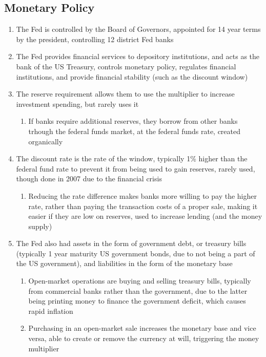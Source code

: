 \documentclass[11 pt, twoside]{article}
\begin{document}
\subsection{Monetary Policy}
\begin{enumerate}
\item The Fed is controlled by the Board of Governors, appointed for 14 year terms by the president, controlling 12 district Fed banks
\item The Fed provides financial services to depository institutions, and acts as the bank of the US Treasury, controls monetary policy, regulates financial institutions, and provide financial stability (such as the discount window)
\item The reserve requirement allows them to use the multiplier to increase investment spending, but rarely uses it
\begin{enumerate}
\item If banks require additional reserves, they borrow from other banks trhough the federal funds market, at the federal funds rate, created organically
\end{enumerate}
\item The discount rate is the rate of the window, typically 1\% higher than the federal fund rate to prevent it from being used to gain reserves, rarely used, though done in 2007 due to the financial crisis
\begin{enumerate}
\item Reducing the rate difference makes banks more willing to pay the higher rate, rather than paying the transaction costs of a proper sale, making it easier if they are low on reserves, used to increase lending (and the money supply)
\end{enumerate}
\item The Fed also had assets in the form of government debt, or treasury bills (typically 1 year maturity US government bonds, due to not being a part of the US government), and liabilities in the form of the monetary base
\begin{enumerate}
\item Open-market operations are buying and selling treasury bills, typically from commercial banks rather than the government, due to the latter being printing money to finance the government deficit, which causes rapid inflation
\item Purchasing in an open-market sale increases the monetary base and vice versa, able to create or remove the currency at will, triggering the money multiplier
\end{enumerate}
\end{enumerate}
\end{document}
